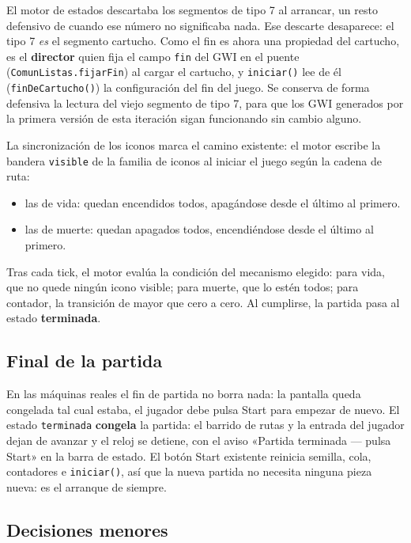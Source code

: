 El motor de estados descartaba los segmentos de tipo 7 al arrancar, un resto
defensivo de cuando ese número no significaba nada. Ese descarte desaparece:
el tipo 7 \emph{es} el segmento cartucho. Como el fin es ahora una propiedad
del cartucho, es el \textbf{director} quien fija el campo \texttt{fin} del GWI
en el puente (\texttt{ComunListas.fijarFin}) al cargar el cartucho, y
\texttt{iniciar()} lee de él (\texttt{finDeCartucho()}) la configuración del
fin del juego. Se conserva de forma defensiva la lectura del viejo segmento de
tipo 7, para que los GWI generados por la primera versión de esta iteración
sigan funcionando sin cambio alguno.

La sincronización de los iconos marca el camino existente: el motor escribe la bandera \texttt{visible} de la familia de iconos al iniciar el  juego según la cadena de ruta:
\begin{itemize}
	\item las de vida: quedan encendidos todos, apagándose desde el último al primero.
	\item las de muerte: quedan apagados todos, encendiéndose desde el último al primero.
\end{itemize}

Tras cada tick, el motor evalúa la condición del mecanismo elegido: para
vida, que no quede ningún icono visible; para muerte, que lo estén todos; para
contador, la transición de mayor que cero a cero. Al cumplirse, la partida
pasa al estado \textbf{terminada}.

\subsection{Final de la partida}
\label{subsec:CongelarF3I11}

En las máquinas reales el fin de partida no borra nada: la pantalla queda congelada tal
cual estaba, el jugador debe pulsa Start para empezar de nuevo. El estado
\texttt{terminada} \textbf{congela} la partida: el barrido de rutas y la
entrada del jugador dejan de avanzar y el reloj se detiene, con el aviso
«Partida terminada — pulsa Start» en la barra de estado. El botón Start
existente reinicia semilla, cola, contadores e \texttt{iniciar()}, así que la
nueva partida no necesita ninguna pieza nueva: es el arranque de siempre.

\subsection{Decisiones menores}
\label{subsec:DecisionesF3I11}

